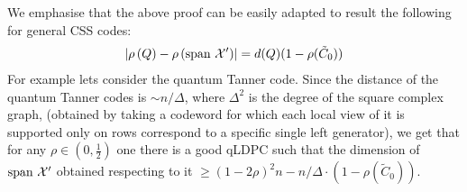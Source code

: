 \documentclass[manuscript,screen,review]{acmart}
\begin{document}
\begin{remark}
  We emphasise that the above proof can be easily adapted to result the following for general CSS codes: 
\begin{equation*}
    \begin{split}
      \left| \rho\left(Q\right) - \rho\left(\text{span }\mathcal{X}^\prime\right) \right| = d(Q)(1 - \rho(\tilde{C}_{0}))
    \end{split}
  \end{equation*}
  For example lets consider the quantum Tanner code. Since the distance of the quantum Tanner codes is $\sim n/\Delta$, where $\Delta^{2}$ is the degree of the square complex graph, (obtained by taking a codeword for which each local view of it is supported only on rows correspond to a specific single left generator), we get that for any $\rho \in (0,\frac{1}{2})$ one there is a good qLDPC such that the dimension of $\text{span }\mathcal{X}^\prime$ obtained respecting to it $\ge (1-2\rho)^{2}n - n/\Delta \cdot (1 - \rho(\tilde{C}_{0}))$.  
\end{remark}
\end{document}
